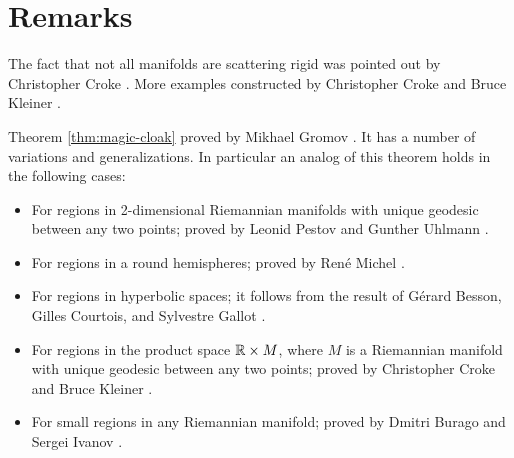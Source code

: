 \section{Remarks}

The fact that not all manifolds are scattering rigid was pointed out by Christopher Croke \cite{croke-1991}.
More examples constructed by Christopher Croke and Bruce Kleiner \cite{croke-kleiner-1994}.

Theorem \ref{thm:magic-cloak} proved by Mikhael Gromov \cite{gromov-1983}.
It has a number of variations and generalizations.
In particular an analog of this theorem holds in the following cases:
\begin{itemize}
\item For regions in 2-dimensional Riemannian manifolds with unique geodesic between any two points; proved by Leonid Pestov and Gunther Uhlmann \cite{pestov-uhlmann}.
\item For regions in a round  hemispheres; proved by Ren\'{e} Michel \cite{michel-1981}.
\item For regions in hyperbolic spaces; it follows from the result of Gérard Besson, Gilles Courtois, and Sylvestre Gallot \cite{besson-courtois-gallot-1995}.
\item For regions in the product space $\mathbb{R}\times M$, where $M$ is a Riemannian manifold with unique geodesic between any two points; proved by Christopher Croke and Bruce Kleiner \cite{croke-kleiner-1998}.
\item For small regions in any Riemannian manifold; proved by Dmitri Burago and Sergei Ivanov \cite{burago-ivanov-2010}.
\end{itemize}



